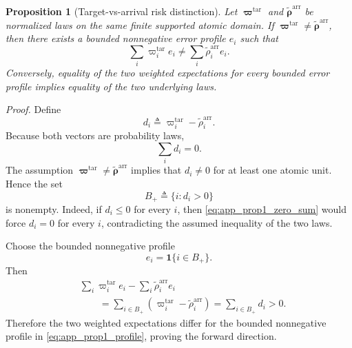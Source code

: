 \documentclass[letterpaper,journal]{IEEEtran}
\newtheorem*{proposition*}{Proposition}
\begin{document}
\begin{proposition*}[Target-vs-arrival risk distinction]
Let $\boldsymbol\varpi^{\mathrm{tar}}$ and
$\widetilde{\boldsymbol\rho}^{\mathrm{arr}}$ be normalized laws on the same
finite supported atomic domain.  If
$\boldsymbol\varpi^{\mathrm{tar}}\neq
\widetilde{\boldsymbol\rho}^{\mathrm{arr}}$, then there exists a bounded
nonnegative error profile $e_i$ such that
\begin{equation}
    \sum_i \varpi_i^{\mathrm{tar}}e_i
    \neq
    \sum_i \widetilde\rho_i^{\mathrm{arr}}e_i.
    \label{eq:app_prop1_claim}
\end{equation}
Conversely, equality of the two weighted expectations for every bounded error
profile implies equality of the two underlying laws.
\end{proposition*}

\noindent\emph{Proof.}
Define
\begin{equation}
    d_i
    \triangleq
    \varpi_i^{\mathrm{tar}}
    -
    \widetilde\rho_i^{\mathrm{arr}}.
    \label{eq:app_prop1_di}
\end{equation}
Because both vectors are probability laws,
\begin{equation}
    \sum_i d_i=0.
    \label{eq:app_prop1_zero_sum}
\end{equation}
The assumption
$\boldsymbol\varpi^{\mathrm{tar}}\neq
\widetilde{\boldsymbol\rho}^{\mathrm{arr}}$
implies that $d_i\neq0$ for at least one atomic unit.  Hence the set
\begin{equation}
    B_+
    \triangleq
    \{i:d_i>0\}
    \label{eq:app_prop1_positive_set}
\end{equation}
is nonempty.  Indeed, if $d_i\le0$ for every $i$, then
\eqref{eq:app_prop1_zero_sum} would force $d_i=0$ for every $i$, contradicting
the assumed inequality of the two laws.

Choose the bounded nonnegative profile
\begin{equation}
    e_i
    =
    \mathbf{1}\{i\in B_+\}.
    \label{eq:app_prop1_profile}
\end{equation}
Then
\begin{align}
 &
 \sum_i
 \varpi_i^{\mathrm{tar}}e_i
 -
 \sum_i
 \widetilde\rho_i^{\mathrm{arr}}e_i
 \nonumber\\
 &\qquad=
 \sum_{i\in B_+}
 \left(
 \varpi_i^{\mathrm{tar}}
 -
 \widetilde\rho_i^{\mathrm{arr}}
 \right)
 =
 \sum_{i\in B_+}d_i
 >0.
 \label{eq:app_prop1_difference}
\end{align}
Therefore the two weighted expectations differ for the bounded nonnegative
profile in \eqref{eq:app_prop1_profile}, proving the forward direction.
\end{document}
